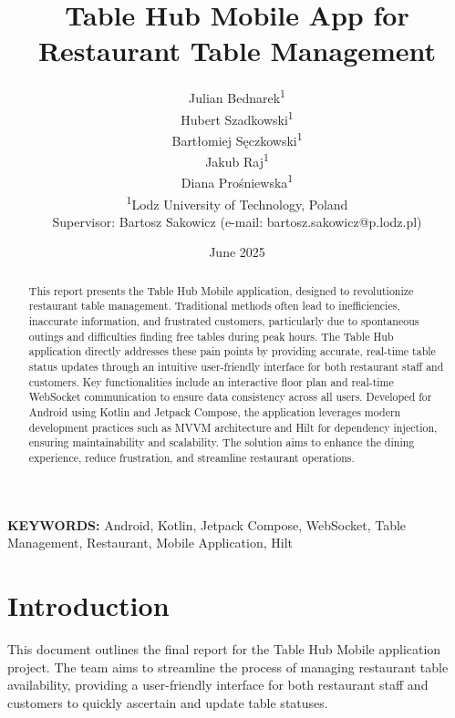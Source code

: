 \documentclass{article}
\makeatletter
\newcommand{\firstauthorname}{Julian Bednarek}
\newcommand{\secondauthorname}{Hubert Szadkowski}
\newcommand{\thirdauthorname}{Bartłomiej Sęczkowski}
\newcommand{\fourthauthorname}{Jakub Raj}
\newcommand{\fifthauthorname}{Diana Prośniewska}
\newcommand{\universityname}{Lodz University of Technology, Poland}
\newcommand{\supervisorname}{Bartosz Sakowicz}
\newcommand{\supervisoremail}{bartosz.sakowicz@p.lodz.pl}
\newcommand{\projecttitle}{Table Hub Mobile App for Restaurant Table Management}
\makeatother
\begin{document}
\title{\projecttitle}
\author{
    \firstauthorname\textsuperscript{1}\\
    \secondauthorname\textsuperscript{1}\\
    \thirdauthorname\textsuperscript{1}\\
    \fourthauthorname\textsuperscript{1}\\
    \fifthauthorname\textsuperscript{1}\\[1ex]
    \textsuperscript{1}\universityname\\[1ex]
    Supervisor: \supervisorname{} (e-mail: \supervisoremail)
}
\date{June 2025}

\maketitle

\begin{abstract}
This report presents the Table Hub Mobile application, designed to revolutionize restaurant table management. Traditional methods often lead to inefficiencies, inaccurate information, and frustrated customers, particularly due to spontaneous outings and difficulties finding free tables during peak hours. The Table Hub application directly addresses these pain points by providing accurate, real-time table status updates through an intuitive user-friendly interface for both restaurant staff and customers. Key functionalities include an interactive floor plan and real-time WebSocket communication to ensure data consistency across all users. Developed for Android using Kotlin and Jetpack Compose, the application leverages modern development practices such as MVVM architecture and Hilt for dependency injection, ensuring maintainability and scalability. The solution aims to enhance the dining experience, reduce frustration, and streamline restaurant operations.
\end{abstract}

\noindent\textbf{KEYWORDS:} Android, Kotlin, Jetpack Compose, WebSocket, Table Management, Restaurant, Mobile Application, Hilt

\section{Introduction}
This document outlines the final report for the Table Hub Mobile application project. The team aims to streamline the process of managing restaurant table availability, providing a user-friendly interface for both restaurant staff and customers to quickly ascertain and update table statuses.
\end{document}
